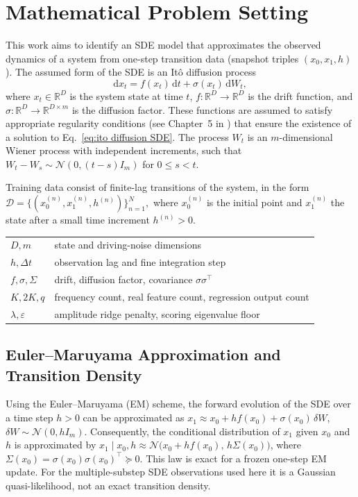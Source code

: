 \documentclass{article}
\begin{document}
\section{Mathematical Problem Setting}\label{sec:mathprobset}
This work aims to identify an SDE model that approximates the observed dynamics of a system from one-step transition data (snapshot triples $(x_0,x_1,h)$).
 The assumed form of the SDE is an It\^{o} diffusion process
\begin{equation}
\label{eq:ito diffusion SDE}
    \mathrm{d}x_t = f(x_t) \, \mathrm{d}t + \sigma(x_t) \, \mathrm{d}W_t,
\end{equation}
where $x_t \in \mathbb{R}^D$ is the system state at time $t$, $f: \mathbb{R}^D \to \mathbb{R}^D$ is the drift function, and $\sigma: \mathbb{R}^D \to \mathbb{R}^{D \times m}$ is the diffusion factor. These functions are assumed to satisfy appropriate regularity conditions (see Chapter~5 in \cite{BerntSDE}) that ensure the existence of a solution to Eq.~\eqref{eq:ito diffusion SDE}.
 The process $W_t$ is an $m$-dimensional Wiener process with independent increments, such that $W_{t} - W_{s} \sim \mathcal{N}(0, (t-s)I_m)$ for $0\leq s < t$.

Training data consist of finite-lag transitions of the system, in the form $\mathcal{D} = \{(x_0^{(n)}, x_1^{(n)}, h^{(n)})\}_{n=1}^N,$
where $x_0^{(n)}$ is the initial point and $x_1^{(n)}$ the state after a small time increment $h^{(n)} > 0$.

\begin{center}\small
\begin{tabular}{ll}
$D,m$ & state and driving-noise dimensions\\
$h,\Delta t$ & observation lag and fine integration step\\
$f,\sigma,\Sigma$ & drift, diffusion factor, covariance $\sigma\sigma^\top$\\
$K,2K,q$ & frequency count, real feature count, regression output count\\
$\lambda,\varepsilon$ & amplitude ridge penalty, scoring eigenvalue floor
\end{tabular}
\end{center}
\subsection*{Euler--Maruyama Approximation and Transition Density}

Using the Euler--Maruyama (EM) scheme, the forward evolution of the SDE over a time step $h>0$ can be approximated as $x_1 \approx x_0 + h f(x_0) + \sigma(x_0)\,\delta W$, $\delta W \sim \mathcal{N}(0, h I_m).$
Consequently, the conditional distribution of $x_1$ given $x_0$ and $h$ is approximated by $x_1 \mid x_0,h \approx \mathcal{N}\!\big(x_0 + h f(x_0),\, h\Sigma(x_0)\big)$,
where $\Sigma(x_0) = \sigma(x_0)\sigma(x_0)^\top\succeq0$.
This law is exact for a frozen one-step EM update. For the multiple-substep SDE observations used here it is a Gaussian quasi-likelihood, not an exact transition density.
\end{document}
